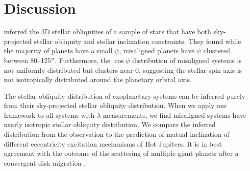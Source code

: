 \documentclass[twocolumn,times]{aastex631}
\begin{document}
\section{Discussion} \label{sec:discussion}

\cite{Albrecht21} inferred the 3D stellar obliquities of a sample of stars that have both sky-projected stellar obliquity and stellar inclination constraints. They found while the majority of planets have a small $\psi$, misaligned planets have $\psi$ clustered between 80--125$\mbox{$^\circ$}$. Furthermore, the $\cos{\psi}$ distribution of misaligned systems is not uniformly distributed but clusters near 0, suggesting the stellar spin axis is not isotropically distributed around the planetary orbital axis.

The stellar obliquity distribution of exoplanetary systems can be inferred purely from their sky-projected stellar obliquity distribution. When we apply our framework to all systems with $\lambda$ measurements, we find misaligned systems have nearly isotropic stellar obliquity distribution. We compare the inferred distribution from the observation to the prediction of mutual inclination of different eccentricity excitation mechanisms of Hot Jupiters. It is in best agreement with the outcome of the scattering of multiple giant planets after a convergent disk migration \citep{Beague12}.


\end{document}

